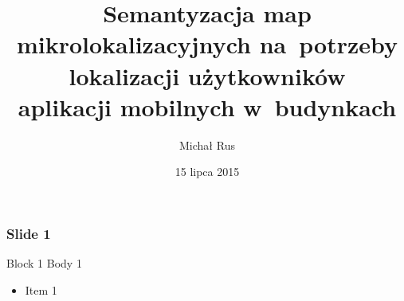 \documentclass{beamer}
\title[Semantyzacja map mikrolokalizacyjnych]{Semantyzacja map mikrolokalizacyjnych na~potrzeby lokalizacji użytkowników\\aplikacji mobilnych w~budynkach}
\author[M. Rus]{Michał Rus}
\date[2015]{15 lipca 2015}
\institute[AGH]{Wydział EAIiIB\\Katedra Informatyki Stosowanej}
\begin{document}
{
	\begin{frame}
		\titlepage
	\end{frame}
}


\begin{frame}
	\frametitle{Slide 1}

	\begin{block}{Block 1}
		Body 1
	\end{block}
	
	\begin{itemize}
		\item Item 1
	\end{itemize}
\end{frame}

\end{document}
